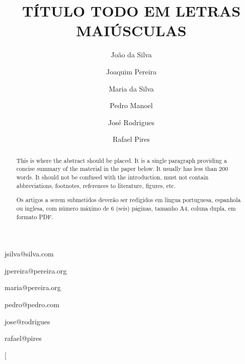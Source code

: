 \documentclass[conference,harvard,brazil,english]{sbatex}
\begin{document}

\title{TÍTULO TODO EM LETRAS MAIÚSCULAS}

\author{João da Silva}{jsilva@silva.com}
\address{Endereço do João e da Maria\\ Em algum lugar\\ Cidade, Estado, País}

\author{Joaquim Pereira}{jpereira@pereira.org}
\address{Endereço do Joaquim\\ Em algum lugar\\ Cidade, Estado, País}

\author[1]{Maria da Silva}{maria@pereira.org}

\author{Pedro Manoel}{pedro@pedro.com}
\address{Endereço do Pedro e do Rafael\\ Em algum lugar\\ Cidade, Estado, País}

\author{José Rodrigues}{jose@rodrigues}
\address{Endereço do José\\ Em algum lugar\\ Cidade, Estado, País}

\author[3]{Rafael Pires}{rafael@pires}


\twocolumn[

\maketitle

\begin{abstract}
  This is where the abstract should be placed. It is a single paragraph providing a concise summary of the material in the paper below. It usually has less than 200 words. It should not be confused with the introduction, must not contain abbreviations, footnotes, references to literature, figures, etc.   \end{abstract}


\begin{abstract}
  Os artigos a serem submetidos deverão ser redigidos em língua portuguesa, espanhola ou inglesa, com número máximo de 6 (seis) páginas, tamanho A4, coluna dupla, em formato PDF.
\end{abstract}
\end{document}
